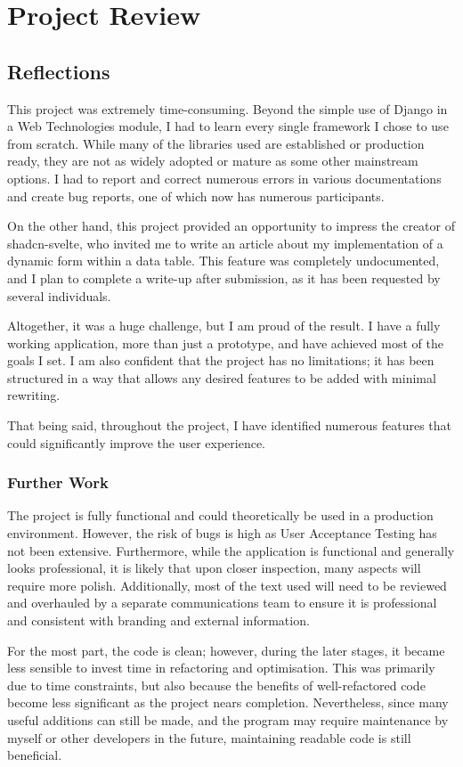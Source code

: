 \chapter{Project Review}
\section{Reflections}
This project was extremely time-consuming. Beyond the simple use of Django in a Web Technologies module, I had to learn every single framework I chose to use from scratch. While many of the libraries used are established or production ready, they are not as widely adopted or mature as some other mainstream options. I had to report and correct numerous errors in various documentations and create bug reports, one of which now has numerous participants.

On the other hand, this project provided an opportunity to impress the creator of shadcn-svelte, who invited me to write an article about my implementation of a dynamic form within a data table. This feature was completely undocumented, and I plan to complete a write-up after submission, as it has been requested by several individuals.

Altogether, it was a huge challenge, but I am proud of the result. I have a fully working application, more than just a prototype, and have achieved most of the goals I set. I am also confident that the project has no limitations; it has been structured in a way that allows any desired features to be added with minimal rewriting.

That being said, throughout the project, I have identified numerous features that could significantly improve the user experience.

\subsection{Further Work}
The project is fully functional and could theoretically be used in a production environment. However, the risk of bugs is high as User Acceptance Testing has not been extensive. Furthermore, while the application is functional and generally looks professional, it is likely that upon closer inspection, many aspects will require more polish. Additionally, most of the text used will need to be reviewed and overhauled by a separate communications team to ensure it is professional and consistent with branding and external information.

For the most part, the code is clean; however, during the later stages, it became less sensible to invest time in refactoring and optimisation. This was primarily due to time constraints, but also because the benefits of well-refactored code become less significant as the project nears completion. Nevertheless, since many useful additions can still be made, and the program may require maintenance by myself or other developers in the future, maintaining readable code is still beneficial.

